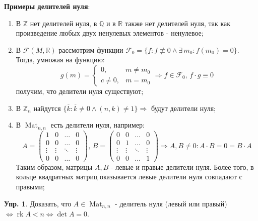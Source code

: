 \documentclass[12pt]{article}
\newcommand{\MR}{\mathbb{R}}
\newcommand{\MQ}{\mathbb{Q}}
\newcommand{\MZ}{\mathbb{Z}}
\newcommand{\MF}{\mathcal{F}}
\theoremstyle{definition}
\newtheorem{exrc}{Упр.}
\DeclareMathOperator{\rk}{\text{rk}}
\newcommand{\mat}[2]{\operatorname{Mat}_{#1, #2}}
\begin{document}
\textbf{Примеры делителей нуля}:
\begin{enumerate}[label=\arabic*)]
	\item В $\MZ$ нет делителей нуля, в $\MQ$ и в $\MR$ также нет делителей нуля, так как произведение любых двух ненулевых элементов - ненулевое;
	\item В $\MF(M,\MR)$ рассмотрим функции $\MF_0 = \{f \colon f\not\equiv 0 \wedge \exists \, m_0 \colon f(m_0) = 0\}$. Тогда, умножая на функцию:
	$$
		g(m) = 
		\begin{cases}
			0, & m \neq m_0 \\
			c \neq0, & m = m_0	
		\end{cases} \Rightarrow f\in \MF_0 ,\, f{\cdot}g \equiv 0
	$$
	получим, что делители нуля существуют;
	\item В $\MZ_n$ найдутся $\{\overline{k} \colon \overline{k} \neq 0 \wedge (n,k) \neq 1 \} \Rightarrow$ будут делители нуля;
	\item В $\mat{n}{n}$ есть делители нуля, например:
	$$
		A = 
		\begin{pmatrix}
			1 & 0 & \dotsc & 0 \\
			0 & 0 & \dotsc & 0\\
			\vdots & \vdots & \ddots & \vdots \\
			0 & 0 & \dotsc & 0
		\end{pmatrix}, \, 
		B = 
		\begin{pmatrix}
			0 & 0 & \dotsc & 0 \\
			0 & 1 & \dotsc & 0\\
			\vdots & \vdots & \ddots & \vdots \\
			0 & 0 & \dotsc & 1
		\end{pmatrix} \Rightarrow A,B \neq 0 \colon A{\cdot}B = 0 = B{\cdot}A
	$$
	Таким образом, матрицы $A, B$ - левые и правые делители нуля. Более того, в кольце квадратных матриц оказывается левые делители нуля совпадают с правыми;
\end{enumerate}

\begin{exrc}
	Доказать, что $A \in \mat{n}{n}$ - делитель нуля (левый или правый) $\Leftrightarrow \rk{A} < n \Leftrightarrow \det{A} = 0$.
\end{exrc}
\end{document}
